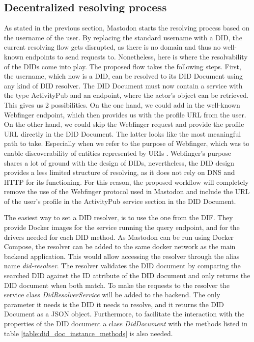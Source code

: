 \subsection{Decentralized resolving process}
As stated in the previous section, Mastodon starts the resolving process based on the username of the user. By replacing the standard username with a DID, the current resolving flow gets disrupted, as there is no domain and thus no well-known endpoints to send requests to. Nonetheless, here is where the resolvability of the DIDs come into play. The proposed flow takes the following steps. First, the username, which now is a DID, can be resolved to its DID Document using any kind of DID resolver. The DID Document must now contain a service with the type ActivityPub and an endpoint, where the actor's object can be retrieved. This gives us 2 possibilities. On the one hand, we could add in the well-known Webfinger endpoint, which then provides us with the profile URL from the user. On the other hand, we could skip the Webfinger request and provide the profile URL directly in the DID Document. The latter looks like the most meaningful path to take. Especially when we refer to the purpose of Webfinger, which was to enable discoverability of entities represented by URIs \cite{jones_salgueiro_jones_smarr_2013}. Webfinger's purpose shares a lot of ground with the design of DIDs, nevertheless, the DID design provides a less limited structure of resolving, as it does not rely on DNS and HTTP for its functioning. For this reason, the proposed workflow will completely remove the use of the  Webfinger protocol used in Mastodon and include the URL of the user's profile in the ActivityPub service section in the DID Document.


The easiest way to set a DID resolver, is to use the one from the DIF. They provide Docker images for the service running the query endpoint, and for the drivers needed for each DID method. As Mastodon can be run using Docker Compose, the resolver can be added to the same docker network as the main backend application. This would allow accessing the resolver through the alias name \emph{did-resolver}. The resolver validates the DID document by comparing the searched DID against the ID attribute of the DID document and only returns the DID document when both match. To make the requests to the resolver the service class \emph{DidResolverService} will be added to the backend. The only parameter it needs is the DID it needs to resolve, and it returns the DID Document as a JSON object. Furthermore, to facilitate the interaction with the properties of the DID document a class \emph{DidDocument} with the methods listed in table \ref{table:did_doc_instance_methods} is also needed.

